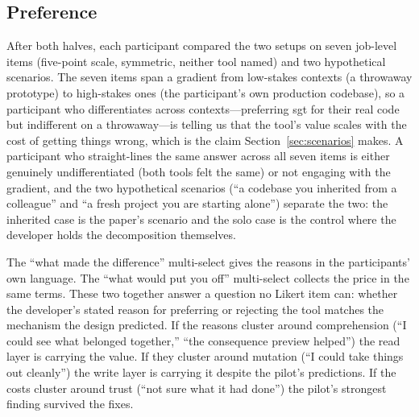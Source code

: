 \subsection{Preference}
\label{sec:findings-preference}

After both halves, each participant compared the two setups on seven job-level
items (five-point scale, symmetric, neither tool named) and two hypothetical
scenarios. The seven items span a gradient from low-stakes contexts (a throwaway
prototype) to high-stakes ones (the participant's own production codebase), so a
participant who differentiates across contexts---preferring sgt for their real
code but indifferent on a throwaway---is telling us that the tool's value scales
with the cost of getting things wrong, which is the claim Section~\ref{sec:scenarios}
makes. A participant who straight-lines the same answer across all seven items is
either genuinely undifferentiated (both tools felt the same) or not engaging with
the gradient, and the two hypothetical scenarios (``a codebase you inherited from
a colleague'' and ``a fresh project you are starting alone'') separate the two:
the inherited case is the paper's scenario and the solo case is the control where
the developer holds the decomposition themselves.

The ``what made the difference'' multi-select gives the reasons in the
participants' own language. The ``what would put you off'' multi-select collects
the price in the same terms. These two together answer a question no Likert item
can: whether the developer's stated reason for preferring or rejecting the tool
matches the mechanism the design predicted. If the reasons cluster around
comprehension (``I could see what belonged together,'' ``the consequence preview
helped'') the read layer is carrying the value. If they cluster around mutation
(``I could take things out cleanly'') the write layer is carrying it despite the
pilot's predictions. If the costs cluster around trust (``not sure what it had
done'') the pilot's strongest finding survived the fixes.

